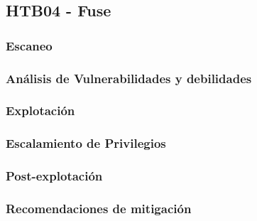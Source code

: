 \subsection{HTB04 - Fuse}
\subsubsection{Escaneo}
\subsubsection{Análisis de Vulnerabilidades y debilidades}
\subsubsection{Explotación}
\subsubsection{Escalamiento de Privilegios}
\subsubsection{Post-explotación}
\subsubsection{Recomendaciones de mitigación}
